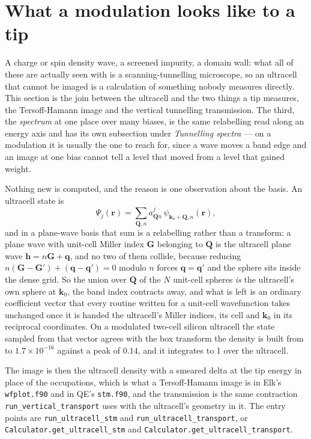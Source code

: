 \documentclass[11pt,a4paper]{article}
\newcommand{\code}[1]{\texttt{\small #1}}
\begin{document}
\section{What a modulation looks like to a tip}

A charge or spin density wave, a screened impurity, a domain wall: what all of
these are actually seen with is a scanning-tunnelling microscope, so an
ultracell that cannot be imaged is a calculation of something nobody measures
directly. This section is the join between the ultracell and the two things a
tip measures, the Tersoff-Hamann image and the vertical tunnelling
transmission. The third, the \emph{spectrum} at one place over many biases, is
the same relabelling read along an energy axis and has its own subsection under
\emph{Tunnelling spectra} --- on a modulation it is usually the one to reach
for, since a wave moves a band edge and an image at one bias cannot tell a level
that moved from a level that gained weight.

Nothing new is computed, and the reason is one observation about the basis. An
ultracell state is
\begin{equation*}
  \Psi_j(\mathbf r) = \sum_{\mathbf Q, n} a^j_{\mathbf Q n}\,
                      \psi_{\mathbf k_0 + \mathbf Q, n}(\mathbf r),
\end{equation*}
and in a plane-wave basis that sum is a relabelling rather than a transform: a
plane wave with unit-cell Miller index $\mathbf G$ belonging to $\mathbf Q$ is
the ultracell plane wave $\mathbf h = n\mathbf G + \mathbf q$, and no two of
them collide, because reducing $n(\mathbf G - \mathbf G') + (\mathbf q -
\mathbf q') = 0$ modulo $n$ forces $\mathbf q = \mathbf q'$ and the sphere sits
inside the dense grid. So the union over $\mathbf Q$ of the $N$ unit-cell
spheres \emph{is} the ultracell's own sphere at $\mathbf k_0$, the band index
contracts away, and what is left is an ordinary coefficient vector that every
routine written for a unit-cell wavefunction takes unchanged once it is handed
the ultracell's Miller indices, its cell and $\mathbf k_0$ in its reciprocal
coordinates. On a modulated two-cell silicon ultracell the state sampled from
that vector agrees with the box transform the density is built from to
$1.7\times10^{-16}$ against a peak of $0.14$, and it integrates to 1 over the
ultracell.

The image is then the ultracell density with a smeared delta at the tip energy
in place of the occupations, which is what a Tersoff-Hamann image is in Elk's
\code{wfplot.f90} and in QE's \code{stm.f90}, and the transmission is the same
contraction \code{run\_vertical\_transport} uses with the ultracell's geometry
in it. The entry points are \code{run\_ultracell\_stm} and
\code{run\_ultracell\_transport}, or \code{Calculator.get\_ultracell\_stm} and
\code{Calculator.get\_ultracell\_transport}.
\end{document}
